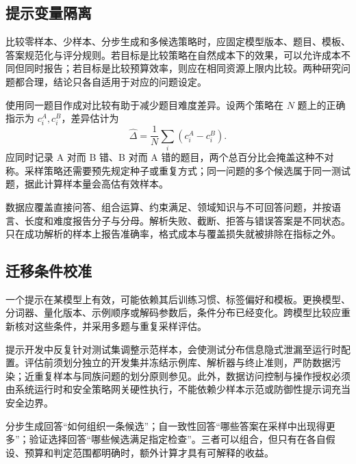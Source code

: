 \documentclass[../textbook.tex]{subfiles}
\begin{document}
\subsection{提示变量隔离}
比较零样本、少样本、分步生成和多候选策略时，应固定模型版本、题目、模板、答案规范化与评分规则。若目标是比较策略在自然成本下的效果，可以允许成本不同但同时报告；若目标是比较预算效率，则应在相同资源上限内比较。两种研究问题都合理，结论只各自适用于对应的问题设定。

使用同一题目作成对比较有助于减少题目难度差异。设两个策略在 $N$ 题上的正确指示为 $c_i^A,c_i^B$，差异估计为
\begin{equation}
\widehat\Delta=\frac1N\sum_i(c_i^A-c_i^B).
\end{equation}
应同时记录 A 对而 B 错、B 对而 A 错的题目，两个总百分比会掩盖这种不对称。采样策略还需要预先规定种子或重复方式；同一问题的多个候选属于同一测试题，据此计算样本量会高估有效样本。

数据应覆盖直接问答、组合运算、约束满足、领域知识与不可回答问题，并按语言、长度和难度报告分子与分母。解析失败、截断、拒答与错误答案是不同状态。只在成功解析的样本上报告准确率，格式成本与覆盖损失就被排除在指标之外。

\subsection{迁移条件校准}
一个提示在某模型上有效，可能依赖其后训练习惯、标签偏好和模板。更换模型、分词器、量化版本、示例顺序或解码参数后，条件分布已经变化。跨模型比较应重新核对这些条件，并采用多题与重复采样评估。

提示开发中反复针对测试集调整示范样本，会使测试分布信息隐式泄漏至运行时配置。评估前须划分独立的开发集并冻结示例库、解析器与终止准则，严防数据污染；近重复样本与同族问题的划分原则参见。此外，数据访问控制与操作授权必须由系统运行时和安全策略网关硬性执行，不能依赖少样本示范或防御性提示词充当安全边界。

\begin{note}
分步生成回答“如何组织一条候选”；自一致性回答“哪些答案在采样中出现得更多”；验证选择回答“哪些候选满足指定检查”。三者可以组合，但只有在各自假设、预算和判定范围都明确时，额外计算才具有可解释的收益。
\end{note}



\chapterreferences
\myendchapterdocument
\end{document}
